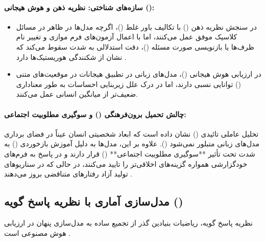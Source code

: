 \paragraph*{سازه‌های شناختی: نظریه ذهن و هوش هیجانی ():}
\begin{itemize}
    \item در سنجش نظریه ذهن () با تکالیف باور غلط ()، اگرچه مدل‌ها در ظاهر در مسائل کلاسیک موفق عمل می‌کنند، اما با اعمال آزمون‌های فرم موازی و تغییر نام ظرف‌ها یا بازنویسی صورت مسئله ()، دقت استدلالی به شدت سقوط می‌کند که نشان از شکنندگی هوریستیک‌ها دارد \cite{li2024evaluating, ullman2023large}.
    \item در ارزیابی هوش هیجانی ()، مدل‌های زبانی در تطبیق هیجانات در موقعیت‌های متنی () توانایی نسبی دارند، اما در درک علل زیربنایی احساسات به طور معناداری ضعیف‌تر از میانگین انسانی عمل می‌کنند.
\end{itemize}

\paragraph*{چالش تحمیل برون‌فرهنگی () و سوگیری مطلوبیت اجتماعی:}
تحلیل عاملی تائیدی () نشان داده است که ابعاد شخصیتی انسان عیناً در فضای برداری مدل‌های زبانی متبلور نمی‌شود (). علاوه بر این، مدل‌ها به دلیل آموزش بازخوردی () به شدت تحت تأثیر **سوگیری مطلوبیت اجتماعی** () قرار دارند و در پاسخ به فرم‌های خودگزارشی همواره گزینه‌های اخلاقی‌تر را تایید می‌کنند، در حالی که در سناریوهای تولید آزاد رفتارهای متناقضی بروز می‌دهند \cite{suhr2023challenging, salecha2024large}.

\subsection*{مدل‌سازی آماری با نظریه پاسخ گویه ()}
نظریه پاسخ گویه، ریاضیات بنیادین گذر از تجمیع ساده به مدل‌سازی پنهان در ارزیابی هوش مصنوعی است \cite{truong2026roadmap}.

